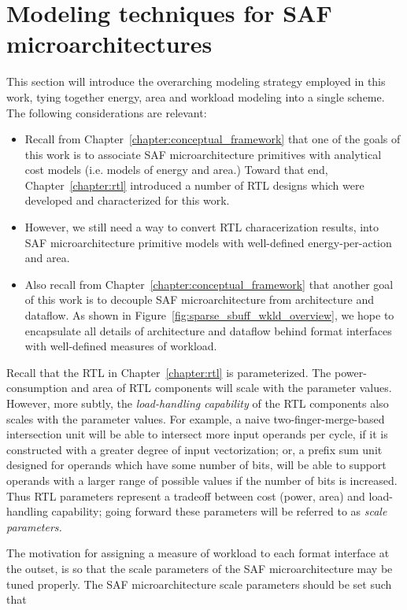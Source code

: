 \chapter{Modeling techniques for SAF microarchitectures}
\label{chapter:modeling}

This section will introduce the overarching modeling strategy employed in this work, tying together energy, area and workload modeling into a single scheme. The following considerations are relevant:

\begin{itemize}
    \item Recall from Chapter~\ref{chapter:conceptual_framework} that one of the goals of this work is to associate SAF microarchitecture primitives with analytical cost models (i.e. models of energy and area.) Toward that end, Chapter~\ref{chapter:rtl} introduced a number of RTL designs which were developed and characterized for this work.
    \item However, we still need a way to convert RTL characerization results, into SAF microarchitecture primitive models with well-defined energy-per-action and area.
    \item Also recall from Chapter~\ref{chapter:conceptual_framework} that another goal of this work is to decouple SAF microarchitecture from architecture and dataflow. As shown in Figure~\ref{fig:sparse_sbuff_wkld_overview}, we hope to encapsulate all details of architecture and dataflow behind format interfaces with well-defined measures of workload.
\end{itemize}

Recall that the RTL in Chapter~\ref{chapter:rtl} is parameterized. The power-consumption and area of RTL components will scale with the parameter values. However, more subtly, the \textit{load-handling capability} of the RTL components also scales with the parameter values. For example, a naive two-finger-merge-based intersection unit will be able to intersect more input operands per cycle, if it is constructed with a greater degree of input vectorization; or, a prefix sum unit designed for operands which have some number of bits, will be able to support operands with a larger range of possible values if the number of bits is increased. Thus RTL parameters represent a tradeoff between cost (power, area) and load-handling capability; going forward these parameters will be referred to as \textit{scale parameters.}

The motivation for assigning a measure of workload to each format interface at the outset, is so that the scale parameters of the SAF microarchitecture may be tuned properly. The SAF microarchitecture scale parameters should be set such that

